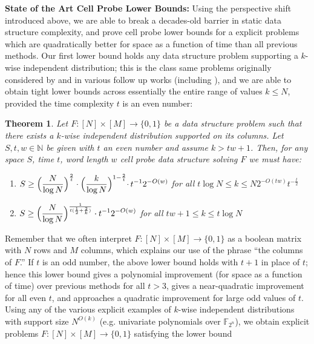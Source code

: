 \documentclass[11pt]{article}
\newtheorem{theorem}{Theorem}
\newcommand{\B}{\{0,1\}}
\begin{document}
{\bf \noindent State of the Art Cell Probe Lower Bounds:} Using the perspective shift introduced above, we are able to break a decades-old barrier in static data structure complexity, and prove cell probe lower bounds for a explicit problems which are quadratically better for space as a function of time than all previous methods. Our first lower bound holds any data structure problem supporting a $k$-wise independent distribution; this is the class same problems originally considered by \cite{Siegel89} and in various follow up works (including \cite{panigrahy,kasper}), and we are able to obtain tight lower bounds across essentially the entire range of values $k \leq N$, provided the time complexity $t$ is an even number:
\begin{theorem}
\label{thm:k-wise-lb}
Let $F: [N] \times [M] \to \B$ be a data structure problem such that there exists a $k$-wise independent distribution supported on its columns. Let $S,t,w \in \mathbb{N}$ be given with $t$ an even number and assume $k > tw + 1$. Then, for any space $S$, time $t$, word length $w$ cell probe data structure solving $F$ we must have:
\begin{enumerate}
    \item $\begin{aligned}[t]
    S \geq  \Bigl( \frac{N}{\log N}\Bigr)^{\frac{2}{t}} \cdot \Bigl(\frac{k}{\log N}\Bigl)^{1 - \frac{2}{t}}  \cdot\,t^{-1}2^{-O(w)}
  \end{aligned}$ for all $t\log N \leq k \leq N 2^{-O(tw)} t^{-\frac{t}{2}}$
  \item $\begin{aligned}[t]
    S \geq   \Bigl( \frac{N}{\log N}\Bigr)^{\frac{1}{t(\frac{1}{2} + \frac{2}{k})}} \cdot t^{-1}2^{-O(w)}
  \end{aligned}$ for all $tw+1 \leq k \leq t\log N$
\end{enumerate}
\end{theorem}
Remember that we often interpret $F:[N] \times [M] \to \B$ as a boolean matrix with $N$ rows and $M$ columns, which explains our use of the phrase ``the columns of $F$.''
If $t$ is an odd number, the above lower bound holds with $t+1$ in place of $t$; hence this lower bound gives a polynomial improvement (for space as a function of time) over previous methods for all $t > 3$, gives a near-quadratic improvement for all even $t$, and approaches a quadratic improvement for large odd values of $t$.  Using any of the various explicit examples of $k$-wise independent distributions with support size $N^{O(k)}$ (e.g. univariate polynomials over $\mathbb{F}_{2^n}$), we obtain explicit problems $F: [N] \times [M] \to \B$ satisfying the lower bound
\end{document}
